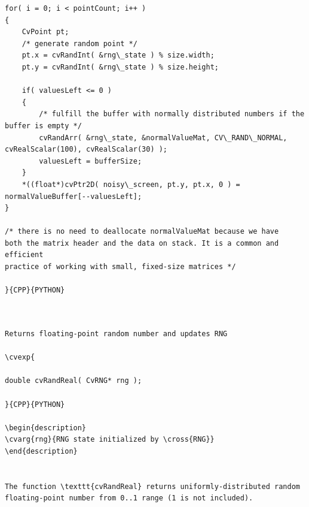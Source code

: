 \begin{verbatim}
for( i = 0; i < pointCount; i++ )
{
    CvPoint pt;
    /* generate random point */
    pt.x = cvRandInt( &rng\_state ) % size.width;
    pt.y = cvRandInt( &rng\_state ) % size.height;

    if( valuesLeft <= 0 )
    {
        /* fulfill the buffer with normally distributed numbers if the buffer is empty */
        cvRandArr( &rng\_state, &normalValueMat, CV\_RAND\_NORMAL, cvRealScalar(100), cvRealScalar(30) );
        valuesLeft = bufferSize;
    }
    *((float*)cvPtr2D( noisy\_screen, pt.y, pt.x, 0 ) = normalValueBuffer[--valuesLeft];
}

/* there is no need to deallocate normalValueMat because we have
both the matrix header and the data on stack. It is a common and efficient
practice of working with small, fixed-size matrices */

}{CPP}{PYTHON}


\end{verbatim}
\label{RandReal}
\begin{verbatim}

Returns floating-point random number and updates RNG

\cvexp{

double cvRandReal( CvRNG* rng );

}{CPP}{PYTHON}

\begin{description}
\cvarg{rng}{RNG state initialized by \cross{RNG}}
\end{description}


The function \texttt{cvRandReal} returns uniformly-distributed random floating-point number from 0..1 range (1 is not included).


\end{verbatim}
